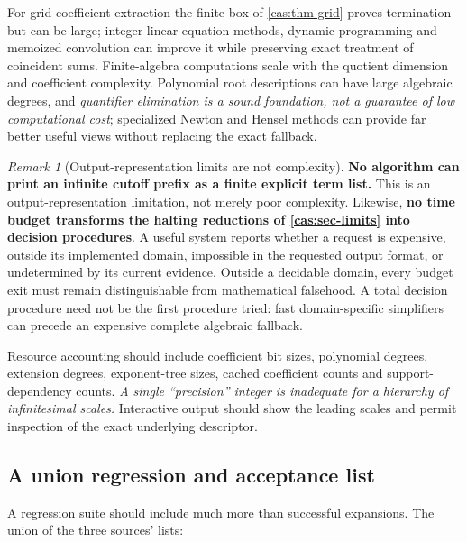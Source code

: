 \documentclass[11pt,letterpaper]{article}
\numberwithin{equation}{section}
\theoremstyle{definition}
\theoremstyle{remark}
\newtheorem{remark}[theorem]{Remark}
\begin{document}
For grid coefficient extraction the finite box of \cref{cas:thm-grid} proves
termination but can be large; integer linear-equation methods, dynamic
programming and memoized convolution can improve it while preserving exact
treatment of coincident sums. Finite-algebra computations scale with the
quotient dimension and coefficient complexity. Polynomial root descriptions can
have large algebraic degrees, and \emph{quantifier elimination is a sound
foundation, not a guarantee of low computational cost}; specialized Newton and
Hensel methods can provide far better useful views without replacing the exact
fallback.

\begin{remark}[Output-representation limits are not complexity]
\label{cas:rem-outputlimit}
\textbf{No algorithm can print an infinite cutoff prefix as a finite explicit
term list.} This is an output-representation limitation, not merely poor
complexity. Likewise, \textbf{no time budget transforms the halting reductions
of \cref{cas:sec-limits} into decision procedures}. A useful system reports
whether a request is expensive, outside its implemented domain, impossible in
the requested output format, or undetermined by its current evidence. Outside a
decidable domain, every budget exit must remain distinguishable from
mathematical falsehood. A total decision procedure need not be the first
procedure tried: fast domain-specific simplifiers can precede an expensive
complete algebraic fallback.
\end{remark}

Resource accounting should include coefficient bit sizes, polynomial degrees,
extension degrees, exponent-tree sizes, cached coefficient counts and
support-dependency counts. \emph{A single ``precision'' integer is inadequate
for a hierarchy of infinitesimal scales.} Interactive output should show the
leading scales and permit inspection of the exact underlying descriptor.

\subsection{A union regression and acceptance list}
\label{cas:sub-regression}
A regression suite should include much more than successful expansions. The
union of the three sources' lists:
\end{document}
